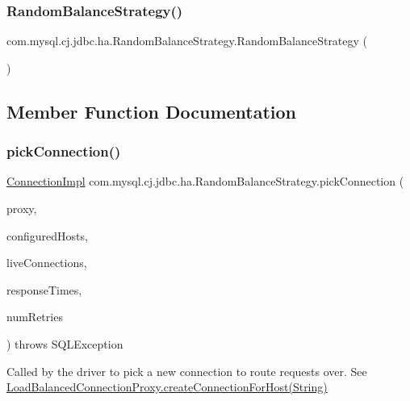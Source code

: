 \subsubsection{\texorpdfstring{Random\+Balance\+Strategy()}{RandomBalanceStrategy()}}
{\footnotesize\ttfamily com.\+mysql.\+cj.\+jdbc.\+ha.\+Random\+Balance\+Strategy.\+Random\+Balance\+Strategy (\begin{DoxyParamCaption}{ }\end{DoxyParamCaption})}



\subsection{Member Function Documentation}
\mbox{\label{classcom_1_1mysql_1_1cj_1_1jdbc_1_1ha_1_1_random_balance_strategy_aefbfa275d5d20205e6eb812224da5a2c}} 
\subsubsection{\texorpdfstring{pick\+Connection()}{pickConnection()}}
{\footnotesize\ttfamily \mbox{\hyperlink{classcom_1_1mysql_1_1cj_1_1jdbc_1_1_connection_impl}{Connection\+Impl}} com.\+mysql.\+cj.\+jdbc.\+ha.\+Random\+Balance\+Strategy.\+pick\+Connection (\begin{DoxyParamCaption}\item[{Invocation\+Handler}]{proxy,  }\item[{List$<$ String $>$}]{configured\+Hosts,  }\item[{Map$<$ String, \mbox{\hyperlink{interfacecom_1_1mysql_1_1cj_1_1jdbc_1_1_jdbc_connection}{Jdbc\+Connection}} $>$}]{live\+Connections,  }\item[{long \mbox{[}$\,$\mbox{]}}]{response\+Times,  }\item[{int}]{num\+Retries }\end{DoxyParamCaption}) throws S\+Q\+L\+Exception}

Called by the driver to pick a new connection to route requests over. See \mbox{\hyperlink{classcom_1_1mysql_1_1cj_1_1jdbc_1_1ha_1_1_load_balanced_connection_proxy_a27662d65e82acb86f3cc6af3f4f331ee}{Load\+Balanced\+Connection\+Proxy.\+create\+Connection\+For\+Host(\+String)}}



